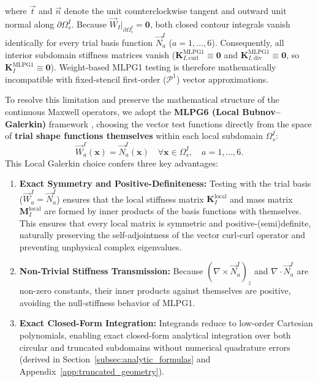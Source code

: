 \documentclass[VANCOUVER]{USG}
\begin{document}
where $\vec{t}$ and $\vec{n}$ denote the unit counterclockwise tangent and outward unit normal along $\partial\Omega_s^I$. Because $\vec{W}_I|_{\partial\Omega_s^I} = \mathbf{0}$, both closed contour integrals vanish identically for every trial basis function $\vec{N}_a^I$ ($a = 1, \dots, 6$). Consequently, all interior subdomain stiffness matrices vanish ($\mathbf{K}_{I,\mathrm{curl}}^{\mathrm{MLPG1}} \equiv \mathbf{0}$ and $\mathbf{K}_{I,\mathrm{div}}^{\mathrm{MLPG1}} \equiv \mathbf{0}$, so $\mathbf{K}_I^{\mathrm{MLPG1}} \equiv \mathbf{0}$). Weight-based MLPG1 testing is therefore mathematically incompatible with fixed-stencil first-order ($\mathcal{P}^1$) vector approximations.

To resolve this limitation and preserve the mathematical structure of the continuous Maxwell operators, we adopt the \textbf{MLPG6 (Local Bubnov--Galerkin)} framework \cite{atluri2002meshless}, choosing the vector test functions directly from the space of \textbf{trial shape functions themselves} within each local subdomain $\Omega_s^I$:
\begin{equation}
    \vec{W}_a^I(\mathbf{x}) = \vec{N}_a^I(\mathbf{x}) \quad \forall \mathbf{x} \in \Omega_s^I, \quad a = 1, \dots, 6.
    \label{eq:mlpg6_choice}
\end{equation}
This Local Galerkin choice confers three key advantages:
\begin{enumerate}
    \item \textbf{Exact Symmetry and Positive-Definiteness:} Testing with the trial basis ($\vec{W}_a^I = \vec{N}_a^I$) ensures that the local stiffness matrix $\mathbf{K}_I^{\mathrm{local}}$ and mass matrix $\mathbf{M}_I^{\mathrm{local}}$ are formed by inner products of the basis functions with themselves. This ensures that every local matrix is symmetric and positive-(semi)definite, naturally preserving the self-adjointness of the vector curl-curl operator and preventing unphysical complex eigenvalues.
    \item \textbf{Non-Trivial Stiffness Transmission:} Because $(\nabla \times \vec{N}_a^I)_z$ and $\nabla \cdot \vec{N}_a^I$ are non-zero constants, their inner products against themselves are positive, avoiding the null-stiffness behavior of MLPG1.
    \item \textbf{Exact Closed-Form Integration:} Integrands reduce to low-order Cartesian polynomials, enabling exact closed-form analytical integration over both circular and truncated subdomains without numerical quadrature errors (derived in Section~\ref{subsec:analytic_formulas} and Appendix~\ref{app:truncated_geometry}).
\end{enumerate}
\end{document}
